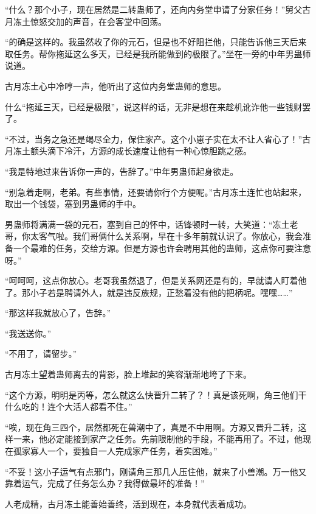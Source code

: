 
\begin{this_body}



“什么？那个小子，现在居然是二转蛊师了，还向内务堂申请了分家任务！”舅父古月冻土惊怒交加的声音，在会客堂中回荡。

“的确是这样的。我虽然收了你的元石，但是也不好阻拦他，只能告诉他三天后来取任务。帮你拖延这么多天，已经是我所能做到的极限了。”坐在一旁的中年男蛊师说道。

古月冻土心中冷哼一声，他听出了这位内务堂蛊师的意思。

什么“拖延三天，已经是极限”，说这样的话，无非是想在来趁机讹诈他一些钱财罢了。

“不过，当务之急还是竭尽全力，保住家产。这个小崽子实在太不让人省心了！”古月冻土额头滴下冷汗，方源的成长速度让他有一种心惊胆跳之感。

“我是特地过来告诉你一声的，告辞了。”中年男蛊师起身欲走。

“别急着走啊，老弟。有些事情，还要请你行个方便呢。”古月冻土连忙也站起来，取出一个钱袋，塞到男蛊师的手中。

男蛊师将满满一袋的元石，塞到自己的怀中，话锋顿时一转，大笑道：“冻土老哥，你太客气啦。我们哥俩什么关系啊，早在十多年前就认识了。你放心，我会准备一个最难的任务，交给方源。但是方源也许会聘用其他的蛊师，这点你可要注意呀。”

“呵呵呵，这点你放心。老哥我虽然退了，但是关系网还是有的，早就请人盯着他了。那小子若是聘请外人，就是违反族规，正愁着没有他的把柄呢。嘿嘿……”

“那这样我就放心了，告辞。”

“我送送你。”

“不用了，请留步。”

古月冻土望着蛊师离去的背影，脸上堆起的笑容渐渐地垮了下来。

“这个方源，明明是丙等，怎么就这么快晋升二转了？！真是该死啊，角三他们干什么吃的！连个大活人都看不住。”

“唉，现在角三四个，居然都死在兽潮中了，真是不中用啊。方源又晋升二转，这样一来，他必定能接到家产之任务。先前限制他的手段，不能再用了。不过，他现在孤家寡人一个，要独自一人完成家产任务，着实困难。”

“不妥！这小子运气有点邪门，刚请角三那几人压住他，就来了小兽潮。万一他又靠着运气，完成了任务怎么办？我得做最坏的准备！”

人老成精，古月冻土能善始善终，活到现在，本身就代表着成功。


\end{this_body}

